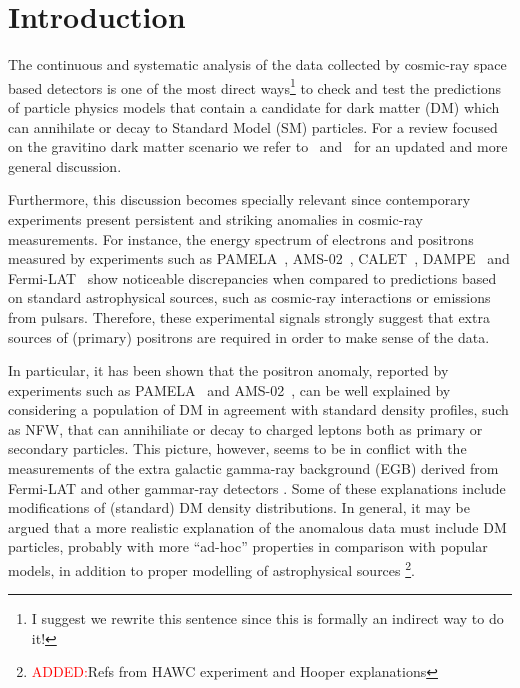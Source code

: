 \documentclass[a4paper,11pt]{article}
\newcommand*{\red}{\textcolor{red}}
\begin{document}


\maketitle


\newpage
\section{Introduction}

The continuous and systematic analysis of the data collected by cosmic-ray space based detectors is one of the most direct ways\footnote{I suggest we rewrite this sentence since this is formally an indirect way to do it!} to check and test the predictions of particle physics models that contain a candidate for dark matter (DM) which can annihilate or decay to Standard Model (SM) particles. For a review focused on the gravitino dark matter scenario we refer to~\cite{Grefe:2011dp} and~\cite{Hooper:2018kfv} for an updated and more general discussion.

Furthermore, this discussion becomes specially relevant since contemporary experiments present persistent and striking anomalies in cosmic-ray measurements. For instance, the energy spectrum of electrons and positrons measured by experiments such as PAMELA~\cite{Adriani:2008zr}, AMS-02~\cite{Accardo:2014lma,Aguilar:2014mma,Aguilar:2014fea}, CALET~\cite{Adriani:2018ktz}, DAMPE~\cite{Ambrosi:2017wek} and Fermi-LAT~\cite{Ackermann:2014usa} show noticeable discrepancies when compared to predictions based on standard astrophysical sources, such as cosmic-ray interactions or emissions from pulsars. Therefore, these experimental signals strongly suggest that extra sources of (primary) positrons are required in order to make sense of the data. 

In particular, it has been shown that the positron anomaly, reported by experiments such as PAMELA~\cite{Adriani:2008zr} and AMS-02~\cite{Accardo:2014lma}, can be well explained by considering a population of DM in agreement with standard density profiles, such as NFW, that can annihiliate or decay to charged leptons both as primary or secondary particles. This picture, however, seems to be in conflict with the measurements of the extra galactic gamma-ray background (EGB) derived from Fermi-LAT and other gammar-ray detectors \cite{Grefe:2008zz,2012PhRvD..86h3506C,Ando:2015qda,Laletin:2016egv,Liu:2016ngs,Belotsky:2016tja}. Some of these explanations include modifications of (standard) DM density distributions. In general, it may be argued that a more realistic explanation of the anomalous data must include DM particles, probably with more ``ad-hoc'' properties in comparison with popular models, in addition to proper modelling of astrophysical sources \cite{Profumo:2018fmz}\cite{Hooper:2017gtd} \footnote{\red{ADDED:}Refs from HAWC experiment and Hooper explanations}.
\end{document}
